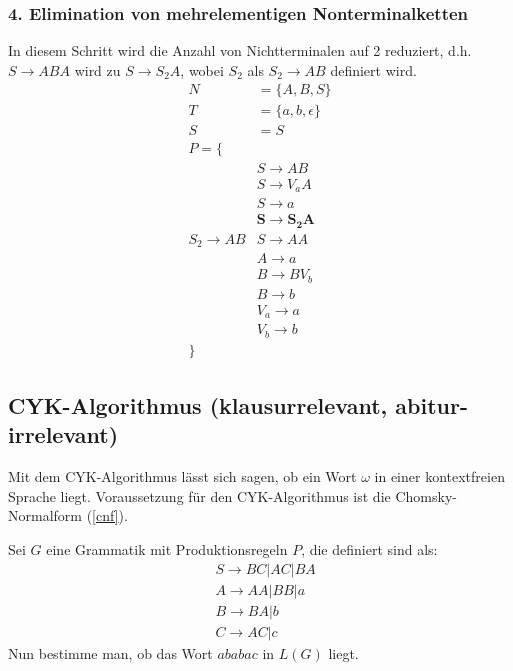 \subsubsection{4. Elimination von mehrelementigen Nonterminalketten}
In diesem Schritt wird die Anzahl von Nichtterminalen auf 2 reduziert, d.h. $S\to ABA$ wird zu $S\to S_2A$, wobei $S_2$ als $S_2\to AB$ definiert wird.
\begin{align*}
    N&=\{A,B,S\}\\
    T&=\{a,b,\epsilon\}\\
    S&=S\\
    P=\{\\
    &S\to AB\\
    &S\to V_{a}A\\
    &S\to a\\
    &\mathbf{S\to S_2A}\\
    S_2\to AB
    &S\to AA\\
    &A\to a\\
    &B\to BV_b\\
    &B\to b\\
    &V_a\to a\\
    &V_b\to b\\
    \}
\end{align*}
\subsection{CYK-Algorithmus (klausurrelevant, abitur-irrelevant)}
Mit dem CYK-Algorithmus lässt sich sagen, ob ein Wort $\omega$ in einer kontextfreien Sprache liegt. Voraussetzung für den CYK-Algorithmus ist die Chomsky-Normalform (\ref{cnf}).
\begin{bsp}
    Sei $G$ eine Grammatik mit Produktionsregeln $P$, die definiert sind als:
    \begin{align*}
        &S\to BC|AC|BA\\
        &A\to AA|BB|a\\
        &B\to BA|b\\
        &C\to AC|c
    \end{align*}
    Nun bestimme man, ob das Wort $ababac$ in $L(G)$ liegt.
\end{bsp}
